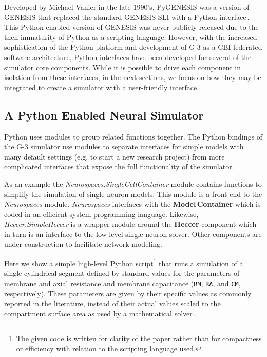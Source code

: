 \documentclass[12pt]{article}
\begin{document}
Developed by Michael Vanier in the late 1990's, PyGENESIS was a
version of GENESIS that replaced the standard GENESIS SLI with a
Python interface\,\cite{vanier97:_genes_python}.  This Python-enabled
version of GENESIS was never publicly released due to the then
immaturity of Python as a scripting language.  However, with the
increased sophistication of the Python platform and development of G-3
as a CBI federated software architecture, Python interfaces have been
developed for several of the simulator core components.  While it is
possible to drive each component in isolation from these interfaces,
in the next sections, we focus on how they may be integrated to create
a simulator with a user-friendly interface.

\subsection{A Python Enabled Neural Simulator}

Python uses modules to group related functions together.  The Python
bindings of the G-3 simulator use modules to separate interfaces for
simple models with many default settings (e.g. to start a new research
project) from more complicated interfaces that expose the full
functionality of the simulator.

As an example the {\it Neurospaces.SingleCellContainer} module
contains functions to simplify the simulation of single neuron models.
This module is a front-end to the {\it Neurospaces} module.  {\it
  Neurospaces} interfaces with the {\bf Model\,Container} which is coded in
an efficient system programming language.  Likewise, {\it
  Heccer.SimpleHeccer} is a wrapper module around the {\bf Heccer}
component which in turn is an interface to the low-level single neuron
solver.  Other components are under construction to facilitate network
modeling.

Here we show a simple high-level Python script\footnote{The given code
  is written for clarity of the paper rather than for compactness or
  efficiency with relation to the scripting language used.} that runs
a simulation of a single cylindrical segment defined by standard
values for the parameters of membrane and axial resistance and
membrane capacitance ({\tt RM}, {\tt RA},
and {\tt CM}, respectively).  These parameters are given by their
specific values as commonly reported in the literature, instead of
their actual values scaled to the compartment surface area as used by
a mathematical solver\,\cite{cornelis04:_neuros_param_handl}.
\end{document}
